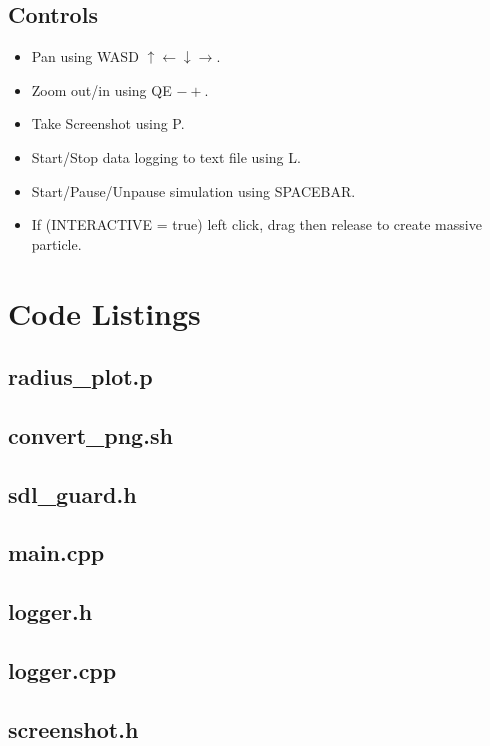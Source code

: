 \documentclass[10pt,a4paper]{article}
\begin{document}
\subsection{Controls}
\begin{itemize}
\item Pan using WASD $\uparrow \leftarrow \downarrow \rightarrow$.
\item Zoom out/in using QE $-+$.
\item Take Screenshot using P.
\item Start/Stop data logging to text file using L.
\item Start/Pause/Unpause simulation using SPACEBAR.
\item If (INTERACTIVE = true) left click, drag then release to create massive particle.
\end{itemize}

\clearpage
{}
\section{Code Listings}
\subsection{radius\_plot.p}

\subsection{convert\_png.sh}

\subsection{sdl\_guard.h}

\clearpage
\subsection{main.cpp}

\clearpage
\subsection{logger.h}

\subsection{logger.cpp}

\clearpage
\subsection{screenshot.h}

\end{document}
